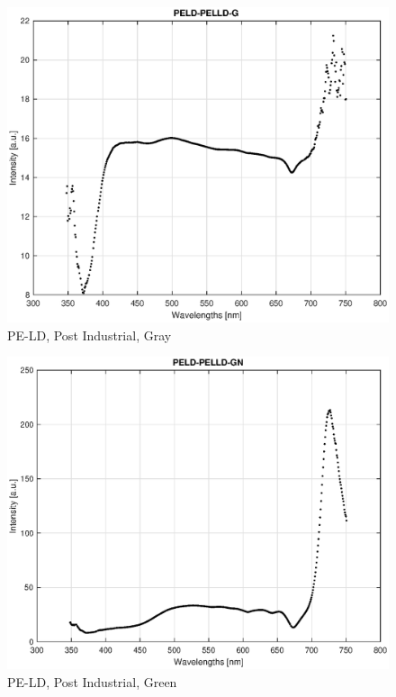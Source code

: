 \begin{appendices}
\begin{figure}
    \centering
    \includegraphics[width = 12cm]{Images/appendix/pe-ld-postindust-gray.eps}
    \caption{PE-LD, Post Industrial, Gray}
    \label{fig:peld-gray}
\end{figure}

\begin{figure}
    \centering
    \includegraphics[width = 12cm]{Images/appendix/pe-ld-postindust-green.eps}
    \caption{PE-LD, Post Industrial, Green}
    \label{fig:peld-green}
\end{figure}


\end{appendices}
